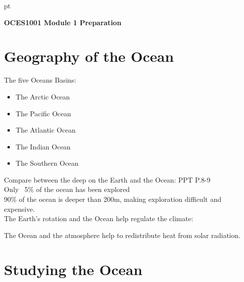 \documentclass[12pt]{article}
\begin{document}
 pt
\begin{center}
{\bf \Large OCES1001 Module 1 Preparation}
\end{center}
\vspace{0.3cm}

\section{Geography of the Ocean}
The five Oceans Basins:
\begin{itemize}
    \item The Arctic Ocean
    \item The Pacific Ocean
    \item The Atlantic Ocean
    \item The Indian Ocean
    \item The Southern Ocean
\end{itemize}
Compare between the deep on the Earth and the Ocean: PPT P.8-9\\
Only ~5\% of the ocean has been explored\\
90\% of the ocean is deeper than 200m, making exploration difficult and expensive.\\
The Earth's rotation and the Ocean help regulate the climate:

The Ocean and the atmosphere help to redistribute heat from solar radiation.\\

\section{Studying the Ocean}
\end{document}
